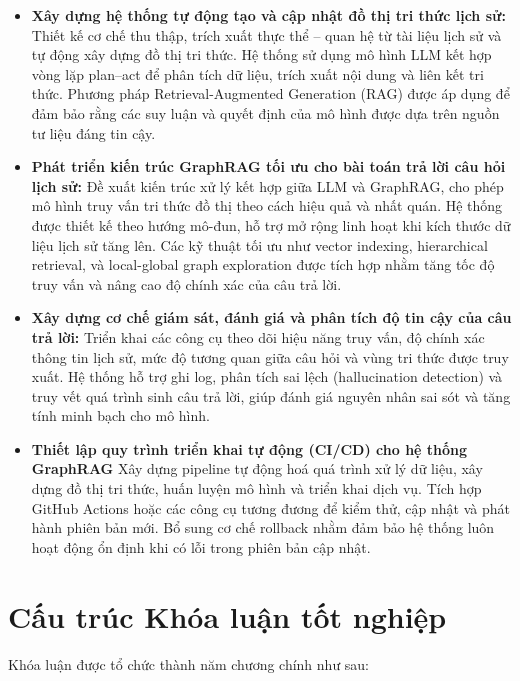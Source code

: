 \begin{itemize}
\item \textbf{Xây dựng hệ thống tự động tạo và cập nhật đồ thị tri thức lịch sử:}
Thiết kế cơ chế thu thập, trích xuất thực thể – quan hệ từ tài liệu lịch sử và tự động xây dựng đồ thị tri thức. Hệ thống sử dụng mô hình LLM kết hợp vòng lặp plan–act để phân tích dữ liệu, trích xuất nội dung và liên kết tri thức. Phương pháp Retrieval-Augmented Generation (RAG) được áp dụng để đảm bảo rằng các suy luận và quyết định của mô hình được dựa trên nguồn tư liệu đáng tin cậy.

\item \textbf{Phát triển kiến trúc GraphRAG tối ưu cho bài toán trả lời câu hỏi lịch sử:}
Đề xuất kiến trúc xử lý kết hợp giữa LLM và GraphRAG, cho phép mô hình truy vấn tri thức đồ thị theo cách hiệu quả và nhất quán. Hệ thống được thiết kế theo hướng mô-đun, hỗ trợ mở rộng linh hoạt khi kích thước dữ liệu lịch sử tăng lên. Các kỹ thuật tối ưu như vector indexing, hierarchical retrieval, và local-global graph exploration được tích hợp nhằm tăng tốc độ truy vấn và nâng cao độ chính xác của câu trả lời.

\item \textbf{Xây dựng cơ chế giám sát, đánh giá và phân tích độ tin cậy của câu trả lời:}
Triển khai các công cụ theo dõi hiệu năng truy vấn, độ chính xác thông tin lịch sử, mức độ tương quan giữa câu hỏi và vùng tri thức được truy xuất. Hệ thống hỗ trợ ghi log, phân tích sai lệch (hallucination detection) và truy vết quá trình sinh câu trả lời, giúp đánh giá nguyên nhân sai sót và tăng tính minh bạch cho mô hình.

\item \textbf{Thiết lập quy trình triển khai tự động (CI/CD) cho hệ thống GraphRAG}
Xây dựng pipeline tự động hoá quá trình xử lý dữ liệu, xây dựng đồ thị tri thức, huấn luyện mô hình và triển khai dịch vụ. Tích hợp GitHub Actions hoặc các công cụ tương đương để kiểm thử, cập nhật và phát hành phiên bản mới. Bổ sung cơ chế rollback nhằm đảm bảo hệ thống luôn hoạt động ổn định khi có lỗi trong phiên bản cập nhật.

\end{itemize}

\section{Cấu trúc Khóa luận tốt nghiệp}
Khóa luận được tổ chức thành năm chương chính như sau:

